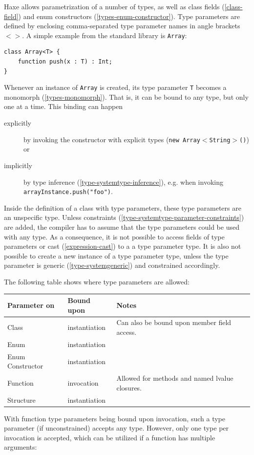 \documentclass[a4paper,oneside]{book}
\newcommand{\type}[1]{\texttt{#1}}
\newcommand{\expr}[1]{\texttt{#1}}
\newcommand{\tref}[2]{#1 (\ref{#2})}
\begin{document}
Haxe allows parametrization of a number of types, as well as \tref{class fields}{class-field} and \tref{enum constructors}{types-enum-constructor}. Type parameters are defined by enclosing comma-separated type parameter names in angle brackets \expr{$<>$}. A simple example from the standard library is \type{Array}:

\begin{lstlisting}
class Array<T> {
	function push(x : T) : Int;
}
\end{lstlisting}
Whenever an instance of \type{Array} is created, its type parameter \type{T} becomes a \tref{monomorph}{types-monomorph}. That is, it can be bound to any type, but only one at a time. This binding can happen

\begin{description}
	\item[explicitly] by invoking the constructor with explicit types (\expr{new Array$<$String$>$()}) or
	\item[implicitly] by \tref{type inference}{type-systemtype-inference}, e.g. when invoking \expr{arrayInstance.push("foo")}.
\end{description}
Inside the definition of a class with type parameters, these type parameters are an unspecific type. Unless \tref{constraints}{type-systemtype-parameter-constraints} are added, the compiler has to assume that the type parameters could be used with any type. As a consequence, it is not possible to access fields of type parameters or \tref{cast}{expression-cast} to a a type parameter type. It is also not possible to create a new instance of a type parameter type, unless the type parameter is \tref{generic}{type-systemgeneric} and constrained accordingly. 

The following table shows where type parameters are allowed:

\begin{center}
\begin{tabular}{| l | l | l |}
	\hline
	Parameter on & Bound upon & Notes \\ \hline
	Class & instantiation & Can also be bound upon member field access. \\
	Enum & instantiation & \\
	Enum Constructor & instantiation & \\
	Function & invocation & Allowed for methods and named lvalue closures. \\
	Structure & instantiation & \\ \hline
\end{tabular}
\end{center}
With function type parameters being bound upon invocation, such a type parameter (if unconstrained) accepts any type. However, only one type per invocation is accepted, which can be utilized if a function has multiple arguments:
\end{document}
